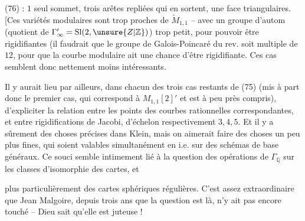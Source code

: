 (76) 
: $1$ seul sommet,
trois arêtes repliées qui en sortent, une face
triangulaires. [Ces variétés modulaires sont
trop proches de $\widetilde M_{1,1}$ -- avec un groupe
d'autom (quotient de $\Gamma'_\infty=\mathrm{Sl}(2,\unsure{Z|\mathbb Z})$) trop petit,
pour pouvoir être rigidifiantes (il faudrait
que le groupe de Galois-Poincaré du rev.
soit multiple de $12$, pour que  la courbe modulaire ait une chance d'être rigidifiante. Ces
cas semblent donc nettement moins intéressants.

Il y aurait lieu par ailleurs, dans chacun des
trois cas restants de (75) (mis à part donc le
premier cas, qui correspond à $M_{1,1}[2]'$ et est
à peu près compris), d'expliciter la relation
entre les points des courbes rationnelles
correspondantes, et entre  rigidifications de
Jacobi, d'échelon respectivement $3,4,5$. Et il y
a sûrement des choses précises dans Klein,
mais on aimerait faire des choses un peu
plus fines, qui soient valables simultanément
en  i.e. sur des schémas
de base généraux. Ce souci semble intimement lié à la question des opérations de
$\Gamma_{\mathbb Q}$ sur les classes d'isomorphie des cartes, et


plus particulièrement des cartes sphériques
régulières. C'est assez extraordinaire que
Jean Malgoire, depuis trois ans que la
question est là, n'y ait pas encore touché
-- Dieu sait qu'elle est juteuse !

